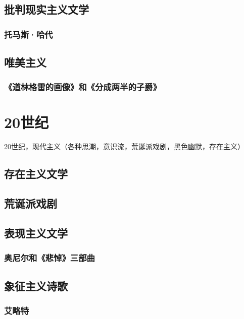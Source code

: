 \documentclass[UTF8]{../../RepresentationUniverse}
\begin{document}
\section{批判现实主义文学}

\subsection{托马斯·哈代}


\section{唯美主义}

\subsection{《道林格雷的画像》和《分成两半的子爵》}




\chapter{20世纪}


20世纪，现代主义（各种思潮，意识流，荒诞派戏剧，黑色幽默，存在主义）



\section{存在主义文学}


\section{荒诞派戏剧}



\section{表现主义文学}

\subsection{奥尼尔和《悲悼》三部曲}



\section{象征主义诗歌}
\subsection{艾略特}
\end{document}
